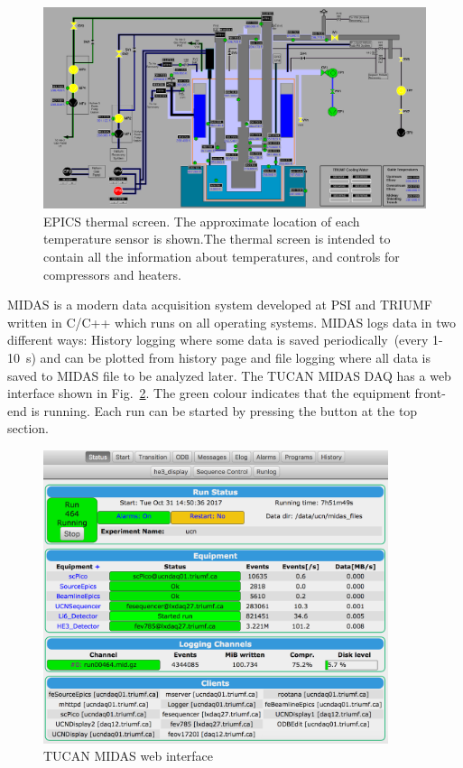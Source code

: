 \begin{figure}[h!]
  \centering
  \includegraphics[width=1.0\textwidth]{epics.png}
  \caption[TUCAN's EPICS thermal screen]{EPICS thermal screen. The
    approximate location of each temperature sensor is shown.The
    thermal screen is intended to contain all the information about
    temperatures, and controls for compressors and heaters. }
  \label{fig:epics}
\end{figure}

MIDAS is a modern data acquisition system developed at PSI and TRIUMF
written in C/C++ which runs on all operating systems. MIDAS logs data
in two different ways: History logging where some data is saved
periodically~(every 1-10~s) and can be plotted from history page and
file logging where all data is saved to MIDAS file to be analyzed
later. The TUCAN MIDAS DAQ has a web interface shown in
Fig.~\ref{fig:midas}. The green colour indicates that the equipment
front-end is running. Each run can be started by pressing the button at
the top section.

\begin{figure}[h!]
  \centering
  \includegraphics[width=0.9\textwidth]{midas.png}
  \caption{TUCAN MIDAS web interface }
  \label{fig:midas}
\end{figure}

